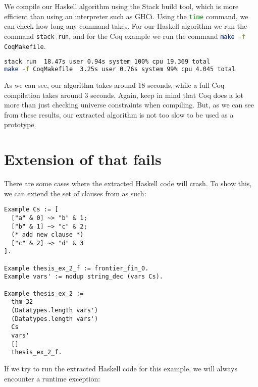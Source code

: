 We compile our Haskell algorithm using the Stack build tool,
which is more efficient than using an interpreter such as GHCi.
Using the \lstinline[language=bash]{time} command, we can check how long
any command takes. For our Haskell algorithm we run the command \lstinline[language=bash]{stack run},
and for the Coq example we run the command \lstinline[language=bash]{make -f CoqMakefile}.

\begin{minipage}{\linewidth}
\begin{lstlisting}[language=bash, label={lst:real_world_example_bench}, caption={Real-world example benchmark}]
stack run  18.47s user 0.94s system 100% cpu 19.369 total
make -f CoqMakefile  3.25s user 0.76s system 99% cpu 4.045 total
\end{lstlisting}
\end{minipage}

As we can see, our algorithm takes around 18 seconds, while a full Coq compilation
takes around 3 seconds.
Again, keep in mind that Coq does a lot more than just checking universe constraints when
compiling. But, as we can see from these results, our extracted algorithm
is not too slow to be used as a prototype.

\section{Extension of  that fails}
\label{sec:limitations}

There are some cases where the extracted Haskell code will crash.
To show this, we can extend the set of clauses from  as such:

\begin{minipage}{\linewidth}
\begin{lstlisting}[language=Coq, label={lst:thm_32_coq_example_extended}, caption={\lstinline{thm_32} example extended}]
Example Cs := [
  ["a" & 0] ~> "b" & 1;
  ["b" & 1] ~> "c" & 2;
  (* add new clause *)
  ["c" & 2] ~> "d" & 3
].

Example thesis_ex_2_f := frontier_fin_0.
Example vars' := nodup string_dec (vars Cs).

Example thesis_ex_2 :=
  thm_32
  (Datatypes.length vars')
  (Datatypes.length vars')
  Cs
  vars'
  []
  thesis_ex_2_f.
\end{lstlisting}
\end{minipage}

If we try to run the extracted Haskell code for this example,
we will always encounter a runtime exception:

